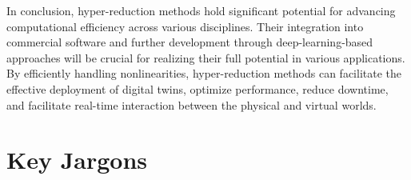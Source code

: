 \documentclass[11pt]{article}
\begin{document}
In conclusion, hyper-reduction methods hold significant potential for advancing computational efficiency across various disciplines.
Their integration into commercial software and further development through deep-learning-based approaches will be crucial for realizing their full potential in various applications.
By efficiently handling nonlinearities, hyper-reduction methods can facilitate the effective deployment of digital twins, optimize performance, reduce downtime, and facilitate real-time interaction between the physical and virtual worlds.




\appendix








        


    










    
    
    
    































































\section{Key Jargons}
\label{sec:glossary}
\end{document}
